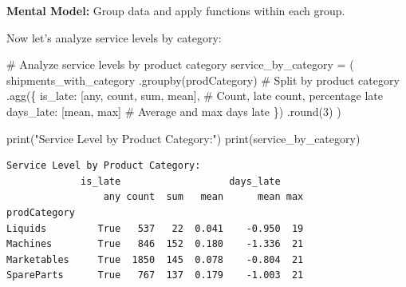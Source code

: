 \documentclass[
  letterpaper,
  DIV=11,
  numbers=noendperiod]{scrartcl}
\newenvironment{Shaded}{\begin{snugshade}}{\end{snugshade}}
\newcommand{\BuiltInTok}[1]{\textcolor[rgb]{0.00,0.23,0.31}{#1}}
\newcommand{\CommentTok}[1]{\textcolor[rgb]{0.37,0.37,0.37}{#1}}
\newcommand{\DecValTok}[1]{\textcolor[rgb]{0.68,0.00,0.00}{#1}}
\newcommand{\NormalTok}[1]{\textcolor[rgb]{0.00,0.23,0.31}{#1}}
\newcommand{\OperatorTok}[1]{\textcolor[rgb]{0.37,0.37,0.37}{#1}}
\newcommand{\StringTok}[1]{\textcolor[rgb]{0.13,0.47,0.30}{#1}}
\begin{document}
\textbf{Mental Model:} Group data and apply functions within each group.

Now let's analyze service levels by category:

\label{mental-model-7-groupby}
\begin{Shaded}
\begin{Highlighting}[]
\CommentTok{\# Analyze service levels by product category}
\NormalTok{service\_by\_category }\OperatorTok{=}\NormalTok{ (}
\NormalTok{    shipments\_with\_category}
\NormalTok{    .groupby(}\StringTok{\textquotesingle{}prodCategory\textquotesingle{}}\NormalTok{)  }\CommentTok{\# Split by product category}
\NormalTok{    .agg(\{}
        \StringTok{\textquotesingle{}is\_late\textquotesingle{}}\NormalTok{: [}\StringTok{\textquotesingle{}any\textquotesingle{}}\NormalTok{, }\StringTok{\textquotesingle{}count\textquotesingle{}}\NormalTok{, }\StringTok{\textquotesingle{}sum\textquotesingle{}}\NormalTok{, }\StringTok{\textquotesingle{}mean\textquotesingle{}}\NormalTok{],  }\CommentTok{\# Count, late count, percentage late}
        \StringTok{\textquotesingle{}days\_late\textquotesingle{}}\NormalTok{: [}\StringTok{\textquotesingle{}mean\textquotesingle{}}\NormalTok{, }\StringTok{\textquotesingle{}max\textquotesingle{}}\NormalTok{]  }\CommentTok{\# Average and max days late}
\NormalTok{    \})}
\NormalTok{    .}\BuiltInTok{round}\NormalTok{(}\DecValTok{3}\NormalTok{)}
\NormalTok{)}

\BuiltInTok{print}\NormalTok{(}\StringTok{"Service Level by Product Category:"}\NormalTok{)}
\BuiltInTok{print}\NormalTok{(service\_by\_category)}
\end{Highlighting}
\end{Shaded}

\begin{verbatim}
Service Level by Product Category:
             is_late                   days_late    
                 any count  sum   mean      mean max
prodCategory                                        
Liquids         True   537   22  0.041    -0.950  19
Machines        True   846  152  0.180    -1.336  21
Marketables     True  1850  145  0.078    -0.804  21
SpareParts      True   767  137  0.179    -1.003  21
\end{verbatim}
\end{document}
